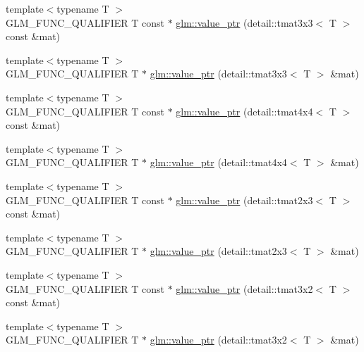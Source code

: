 \begin{DoxyCompactItemize}
\item 
{\footnotesize template$<$typename T $>$ }\\G\+L\+M\+\_\+\+F\+U\+N\+C\+\_\+\+Q\+U\+A\+L\+I\+F\+I\+E\+R T const $\ast$ \hyperlink{group__gtc__type__ptr_ga23b2a53a00923f747637fc271f78e9db}{glm\+::value\+\_\+ptr} (detail\+::tmat3x3$<$ T $>$ const \&mat)
\item 
{\footnotesize template$<$typename T $>$ }\\G\+L\+M\+\_\+\+F\+U\+N\+C\+\_\+\+Q\+U\+A\+L\+I\+F\+I\+E\+R T $\ast$ \hyperlink{group__gtc__type__ptr_ga2cadd2b9a774d77c66e8f723b729c4e7}{glm\+::value\+\_\+ptr} (detail\+::tmat3x3$<$ T $>$ \&mat)
\item 
{\footnotesize template$<$typename T $>$ }\\G\+L\+M\+\_\+\+F\+U\+N\+C\+\_\+\+Q\+U\+A\+L\+I\+F\+I\+E\+R T const $\ast$ \hyperlink{group__gtc__type__ptr_ga1e7076c8387f3e7436a00453a1f5fe5e}{glm\+::value\+\_\+ptr} (detail\+::tmat4x4$<$ T $>$ const \&mat)
\item 
{\footnotesize template$<$typename T $>$ }\\G\+L\+M\+\_\+\+F\+U\+N\+C\+\_\+\+Q\+U\+A\+L\+I\+F\+I\+E\+R T $\ast$ \hyperlink{group__gtc__type__ptr_gadc0d39ee1a6b84a4337840746649cca3}{glm\+::value\+\_\+ptr} (detail\+::tmat4x4$<$ T $>$ \&mat)
\item 
{\footnotesize template$<$typename T $>$ }\\G\+L\+M\+\_\+\+F\+U\+N\+C\+\_\+\+Q\+U\+A\+L\+I\+F\+I\+E\+R T const $\ast$ \hyperlink{group__gtc__type__ptr_ga7a07a13118bdceeaef82e330f8f47fcf}{glm\+::value\+\_\+ptr} (detail\+::tmat2x3$<$ T $>$ const \&mat)
\item 
{\footnotesize template$<$typename T $>$ }\\G\+L\+M\+\_\+\+F\+U\+N\+C\+\_\+\+Q\+U\+A\+L\+I\+F\+I\+E\+R T $\ast$ \hyperlink{group__gtc__type__ptr_gac99ce6d08fb5b645d543ea875567ea3b}{glm\+::value\+\_\+ptr} (detail\+::tmat2x3$<$ T $>$ \&mat)
\item 
{\footnotesize template$<$typename T $>$ }\\G\+L\+M\+\_\+\+F\+U\+N\+C\+\_\+\+Q\+U\+A\+L\+I\+F\+I\+E\+R T const $\ast$ \hyperlink{group__gtc__type__ptr_gad58ae53d7a86bf7caadd7f1be2db3f1a}{glm\+::value\+\_\+ptr} (detail\+::tmat3x2$<$ T $>$ const \&mat)
\item 
{\footnotesize template$<$typename T $>$ }\\G\+L\+M\+\_\+\+F\+U\+N\+C\+\_\+\+Q\+U\+A\+L\+I\+F\+I\+E\+R T $\ast$ \hyperlink{group__gtc__type__ptr_ga241b3c1e7e747ab934e2c38679fe90a5}{glm\+::value\+\_\+ptr} (detail\+::tmat3x2$<$ T $>$ \&mat)

\end{DoxyCompactItemize}
